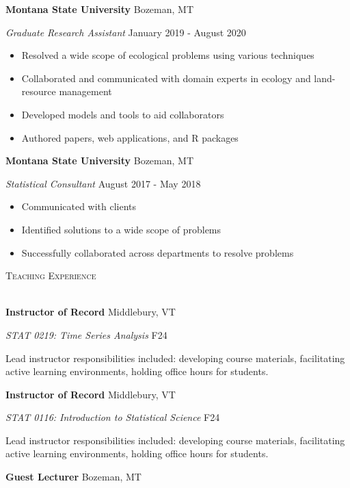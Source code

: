 \documentclass[a4paper]{article}
\newcommand{\lineunder} {
	\vspace*{-8pt} \\
	\hspace*{-18pt} \hrulefill \\
}
\newcommand{\header} [1] {
	{\hspace*{-18pt}\vspace*{6pt} \textcolor{Cerulean}{\textsc{#1}}}
	\vspace*{-6pt} \textcolor{Cerulean}{\lineunder}
}
\begin{document}
\textbf{Montana State University} \hfill Bozeman, MT

\textit{Graduate Research Assistant} \hfill January 2019 - August 2020

\vspace{-1mm}
\begin{itemize} \itemsep 1pt
   \item Resolved a wide scope of ecological problems using various techniques
   \item Collaborated and communicated with domain experts in ecology and land-resource management
   \item Developed models and tools to aid collaborators
   \item Authored papers, web applications, and R packages
\end{itemize}

\textbf{Montana State University} \hfill Bozeman, MT

\textit{Statistical Consultant} \hfill August 2017 - May 2018

\vspace{-1mm}
\begin{itemize} \itemsep 1pt
   \item Communicated with clients
   \item Identified solutions to a wide scope of problems
   \item Successfully collaborated across departments to resolve problems
\end{itemize}

\header{Teaching Experience}
\vspace*{2mm}

\textbf{Instructor of Record} \hfill Middlebury, VT

\emph{STAT 0219: Time Series Analysis} \hfill F24

Lead instructor responsibilities included: developing course materials,
facilitating active learning environments, holding office hours for
students. \vspace*{2mm}

\textbf{Instructor of Record} \hfill Middlebury, VT

\emph{STAT 0116: Introduction to Statistical Science} \hfill F24

Lead instructor responsibilities included: developing course materials,
facilitating active learning environments, holding office hours for
students. \vspace*{2mm}

\textbf{Guest Lecturer} \hfill Bozeman, MT
\end{document}

